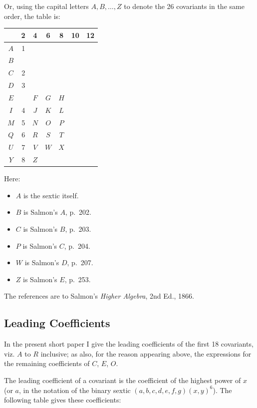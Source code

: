 \documentclass[11pt,a4paper]{article}
\theoremstyle{definition}
\begin{document}
Or, using the capital letters $A, B, \dots, Z$ to denote the 26 covariants in the same order, the table is:

\begin{center}
\begin{tabular}{c|cccccc}
\toprule
 & 2 & 4 & 6 & 8 & 10 & 12 \\
\midrule
$A$ & 1 & & & & & \\
$B$ & & & & & & \\
$C$ & 2 & & & & & \\
$D$ & 3 & & & & & \\
$E$ & & $F$ & $G$ & $H$ & & \\
$I$ & 4 & $J$ & $K$ & $L$ & & \\
$M$ & 5 & $N$ & $O$ & $P$ & & \\
$Q$ & 6 & $R$ & $S$ & $T$ & & \\
$U$ & 7 & $V$ & $W$ & $X$ & & \\
$Y$ & 8 & $Z$ & & & & \\
\bottomrule
\end{tabular}
\end{center}

Here:
\begin{itemize}[noitemsep]
\item $A$ is the sextic itself.
\item $B$ is Salmon's $A$, p.~202.
\item $C$ is Salmon's $B$, p.~203.
\item $P$ is Salmon's $C$, p.~204.
\item $W$ is Salmon's $D$, p.~207.
\item $Z$ is Salmon's $E$, p.~253.
\end{itemize}
The references are to Salmon's \textit{Higher Algebra}, 2nd Ed., 1866.

\subsection*{Leading Coefficients}

In the present short paper I give the leading coefficients of the first 18 covariants, viz. $A$ to $R$ inclusive; as also, for the reason appearing above, the expressions for the remaining coefficients of $C$, $E$, $O$.

The leading coefficient of a covariant is the coefficient of the highest power of $x$ (or $a$, in the notation of the binary sextic $(a, b, c, d, e, f, g)(x, y)^6$). The following table gives these coefficients:
\end{document}

